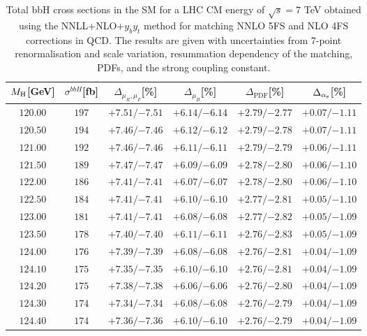 \begin{table}[ht!]
\caption{Total bbH{} cross sections in the SM for a LHC CM energy of $\sqrt{s}=7$ TeV obtained using the NNLL+NLO+$y_by_t$ method for matching NNLO 5FS and NLO 4FS corrections in QCD. The results are given with uncertainties from 7-point renormalisation and scale variation, resummation dependency of the matching, PDFs, and the strong coupling constant.}
\label{tab:bbH7}
\begin{center}%
\begin{small}%
\begin{tabular}{cccccc}%
\toprule
$M_\mathrm{H}$[GeV] & $\sigma^{bbH}$[fb] & $\Delta_{\mu_{R},\mu_{F}}$[\%] & $\Delta_{\mu_{B}}$[\%] & $\Delta_{\mathrm{PDF}}$[\%] & $\Delta_{\alpha_{\mathrm{s}}}$[\%] \\
\midrule
$120.00$ & $197$ & ${+7.51}/{-7.51}$ & ${+6.14}/{-6.14}$ & ${+2.79}/{-2.77}$ & ${+0.07}/{-1.11}$ \\
$120.50$ & $194$ & ${+7.46}/{-7.46}$ & ${+6.12}/{-6.12}$ & ${+2.79}/{-2.78}$ & ${+0.07}/{-1.11}$ \\
$121.00$ & $192$ & ${+7.46}/{-7.46}$ & ${+6.11}/{-6.11}$ & ${+2.79}/{-2.79}$ & ${+0.06}/{-1.11}$ \\
$121.50$ & $189$ & ${+7.47}/{-7.47}$ & ${+6.09}/{-6.09}$ & ${+2.78}/{-2.80}$ & ${+0.06}/{-1.10}$ \\
$122.00$ & $186$ & ${+7.41}/{-7.41}$ & ${+6.07}/{-6.07}$ & ${+2.78}/{-2.80}$ & ${+0.06}/{-1.10}$ \\
$122.50$ & $184$ & ${+7.41}/{-7.41}$ & ${+6.10}/{-6.10}$ & ${+2.77}/{-2.81}$ & ${+0.05}/{-1.10}$ \\
$123.00$ & $181$ & ${+7.41}/{-7.41}$ & ${+6.08}/{-6.08}$ & ${+2.77}/{-2.82}$ & ${+0.05}/{-1.09}$ \\
$123.50$ & $178$ & ${+7.40}/{-7.40}$ & ${+6.11}/{-6.11}$ & ${+2.76}/{-2.83}$ & ${+0.05}/{-1.09}$ \\
$124.00$ & $176$ & ${+7.39}/{-7.39}$ & ${+6.08}/{-6.08}$ & ${+2.76}/{-2.81}$ & ${+0.04}/{-1.09}$ \\
$124.10$ & $175$ & ${+7.35}/{-7.35}$ & ${+6.10}/{-6.10}$ & ${+2.76}/{-2.81}$ & ${+0.04}/{-1.09}$ \\
$124.20$ & $175$ & ${+7.38}/{-7.38}$ & ${+6.06}/{-6.06}$ & ${+2.76}/{-2.80}$ & ${+0.04}/{-1.09}$ \\
$124.30$ & $174$ & ${+7.34}/{-7.34}$ & ${+6.08}/{-6.08}$ & ${+2.76}/{-2.79}$ & ${+0.04}/{-1.09}$ \\
$124.40$ & $174$ & ${+7.36}/{-7.36}$ & ${+6.10}/{-6.10}$ & ${+2.76}/{-2.79}$ & ${+0.04}/{-1.09}$ \\

\end{tabular}
\end{small}
\end{center}
\end{table}

